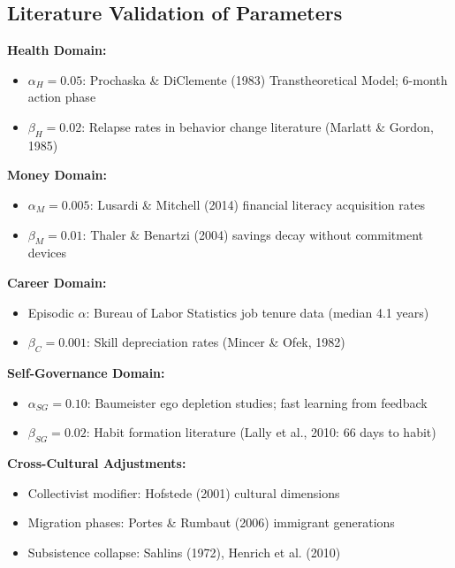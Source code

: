 \subsection{Literature Validation of Parameters}

\begin{tcolorbox}[colback=blue!5!white, colframe=blue!75!black, title=Parameter Sources]

\textbf{Health Domain:}
\begin{itemize}[nosep]
\item $\alpha_H = 0.05$: Prochaska \& DiClemente (1983) Transtheoretical Model; 6-month action phase
\item $\beta_H = 0.02$: Relapse rates in behavior change literature (Marlatt \& Gordon, 1985)
\end{itemize}

\textbf{Money Domain:}
\begin{itemize}[nosep]
\item $\alpha_M = 0.005$: Lusardi \& Mitchell (2014) financial literacy acquisition rates
\item $\beta_M = 0.01$: Thaler \& Benartzi (2004) savings decay without commitment devices
\end{itemize}

\textbf{Career Domain:}
\begin{itemize}[nosep]
\item Episodic $\alpha$: Bureau of Labor Statistics job tenure data (median 4.1 years)
\item $\beta_C = 0.001$: Skill depreciation rates (Mincer \& Ofek, 1982)
\end{itemize}

\textbf{Self-Governance Domain:}
\begin{itemize}[nosep]
\item $\alpha_{SG} = 0.10$: Baumeister ego depletion studies; fast learning from feedback
\item $\beta_{SG} = 0.02$: Habit formation literature (Lally et al., 2010: 66 days to habit)
\end{itemize}

\textbf{Cross-Cultural Adjustments:}
\begin{itemize}[nosep]
\item Collectivist modifier: Hofstede (2001) cultural dimensions
\item Migration phases: Portes \& Rumbaut (2006) immigrant generations
\item Subsistence collapse: Sahlins (1972), Henrich et al. (2010)
\end{itemize}

\end{tcolorbox}

